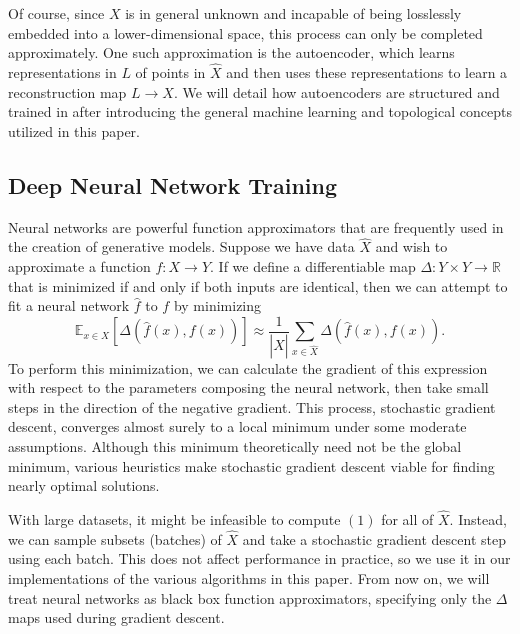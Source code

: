 \documentclass[conference]{IEEEtran}
\newcommand{\R}{\mathbb{R}}
\begin{document}
Of course, since $X$ is in general unknown and incapable of being losslessly embedded into a lower-dimensional space, this process can only be completed approximately. One such approximation is the autoencoder, which learns representations in $L$ of points in $\hat{X}$ and then uses these representations to learn a reconstruction map $L\to X$. We will detail how autoencoders are structured and trained in  after introducing the general machine learning and topological concepts utilized in this paper.

\subsection{Deep Neural Network Training}

Neural networks are powerful function approximators that are frequently used in the creation of generative models. Suppose we have data $\hat{X}$ and wish to approximate a function $f:X\to Y$. If we define a differentiable map $\Delta:Y \times Y \to \R$ that is minimized if and only if both inputs are identical, then we can attempt to fit a neural network $\hat{f}$ to $f$ by minimizing
\begin{equation}
	\mathbb{E}_{x \in X}\left[ \Delta(\hat{f}(x),f(x)) \right] \approx \frac{1}{|\hat{X}|} \sum_{x\in \hat{X}} \Delta(\hat{f}(x),f(x)).
\end{equation}
To perform this minimization, we can calculate the gradient of this expression with respect to the parameters composing the neural network, then take small steps in the direction of the negative gradient. This process, stochastic gradient descent, converges almost surely to a local minimum under some moderate assumptions. Although this minimum theoretically need not be the global minimum, various heuristics make stochastic gradient descent viable for finding nearly optimal solutions.

With large datasets, it might be infeasible to compute $(1)$ for all of $\hat{X}$. Instead, we can sample subsets (batches) of $\hat{X}$ and take a stochastic gradient descent step using each batch. This does not affect performance in practice, so we use it in our implementations of the various algorithms in this paper. From now on, we will treat neural networks as black box function approximators, specifying only the $\Delta$ maps used during gradient descent.

\end{document}
